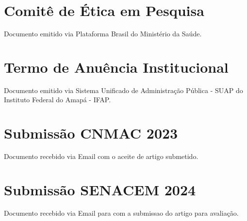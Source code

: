 
\begin{anexosenv}
\partanexos   %

\chapter{Comitê de Ética em Pesquisa}
\begin{center}
    Documento emitido via Plataforma Brasil do Ministério da Saúde.    
\end{center}




\chapter{Termo de Anuência Institucional}
\begin{center}
    Documento emitido via Sistema Unificado de Administração Pública - SUAP do Instituto Federal do Amapá - IFAP.    
\end{center}



\chapter{Submissão CNMAC 2023}
\begin{center}
    Documento recebido via Email com o aceite de artigo submetido.    
\end{center}



\chapter{Submissão SENACEM 2024}
\begin{center}
    Documento recebido via Email para com a submissao do artigo para avaliação.    
\end{center}


\end{anexosenv}
